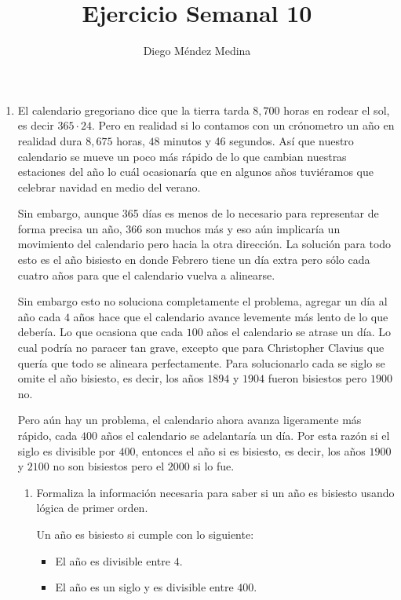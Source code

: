 \documentclass[8pt, letterpaper]{article}
\title{%
  Ejercicio Semanal 10\\
  {\large{}}}
\author{Diego Méndez Medina}
\date{}
\begin{document}
\ttfamily
\maketitle
\rmfamily

\begin{enumerate}
\item El calendario gregoriano dice que la tierra tarda $8,700$ horas en
  rodear el sol, es decir $365\cdot 24$. Pero en realidad si lo contamos con
  un crónometro un año en realidad dura $8,675$ horas, $48$ minutos y 46
  segundos. Así que nuestro calendario se mueve un poco más rápido de lo que
  cambian nuestras estaciones del año lo cuál ocasionaría que en algunos
  años tuviéramos que celebrar navidad en medio del verano.

  Sin embargo, aunque 365 días es menos de lo necesario para representar
  de forma precisa un año, 366 son muchos más y eso aún implicaría
  un movimiento del calendario pero hacia la otra dirección. La solución
  para todo esto es el año bisiesto en donde Febrero tiene un día extra
  pero sólo cada cuatro años para que el calendario vuelva a alinearse.

  Sin embargo esto no soluciona completamente el problema, agregar
  un día al año cada $4$ años hace que el calendario avance levemente
  más lento de lo que debería. Lo que ocasiona que cada $100$ años el
  calendario se atrase un día. Lo cual podría no paracer tan grave, excepto
  que para Christopher Clavius que quería que todo se alineara perfectamente.
  Para solucionarlo cada se siglo se omite el año bisiesto, es decir, los
  años $1894$ y $1904$ fueron bisiestos pero $1900$ no.
  
  Pero aún hay un problema, el calendario ahora avanza ligeramente
  más rápido, cada $400$ años el calendario se adelantaría un día. Por
  esta razón si el siglo es divisible por $400$, entonces el año si es
  bisiesto, es decir, los años $1900$ y $2100$ no son bisiestos pero el
  $2000$ si lo fue.
  
  \begin{enumerate}
  \item Formaliza la información necesaria para saber si un año
    es bisiesto usando lógica de primer orden.

    \hfill\break
    Un año es bisiesto si cumple con lo siguiente:
    \begin{itemize}
    \item El año es divisible entre $4$.
    \item El año es un siglo y es divisible entre $400$.
    \end{itemize}


\end{enumerate}
\end{enumerate}
\end{document}
